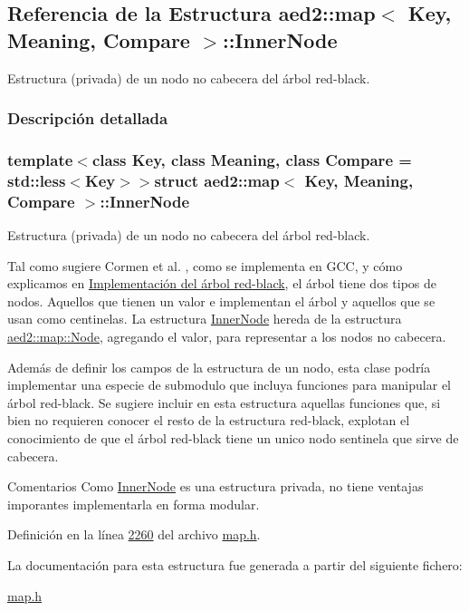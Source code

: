\hypertarget{structaed2_1_1map_1_1InnerNode}{\subsection{\-Referencia de la \-Estructura aed2\-:\-:map$<$ \-Key, \-Meaning, \-Compare $>$\-:\-:\-Inner\-Node}
\label{structaed2_1_1map_1_1InnerNode}
}


\-Estructura (privada) de un nodo no cabecera del árbol red-\/black.  




\subsubsection{\-Descripción detallada}
\subsubsection*{template$<$class \-Key, class \-Meaning, class \-Compare = std\-::less$<$\-Key$>$$>$struct aed2\-::map$<$ Key, Meaning, Compare $>$\-::\-Inner\-Node}

\-Estructura (privada) de un nodo no cabecera del árbol red-\/black. 

\-Tal como sugiere \-Cormen et al. \cite{CormenLeisersonRivestStein2009}, como se implementa en \-G\-C\-C, y cómo explicamos en \hyperlink{Implementacion}{\-Implementación del árbol red-\/black}, el árbol tiene dos tipos de nodos. \-Aquellos que tienen un valor e implementan el árbol y aquellos que se usan como centinelas. \-La estructura \hyperlink{structaed2_1_1map_1_1InnerNode}{\-Inner\-Node} hereda de la estructura \hyperlink{structaed2_1_1map_1_1Node}{aed2\-::map\-::\-Node}, agregando el valor, para representar a los nodos no cabecera.

\-Además de definir los campos de la estructura de un nodo, esta clase podría implementar una especie de submodulo que incluya funciones para manipular el árbol red-\/black. \-Se sugiere incluir en esta estructura aquellas funciones que, si bien no requieren conocer el resto de la estructura red-\/black, explotan el conocimiento de que el árbol red-\/black tiene un unico nodo sentinela que sirve de cabecera.

\begin{DoxyRemark}{\-Comentarios}
\-Como \hyperlink{structaed2_1_1map_1_1InnerNode}{\-Inner\-Node} es una estructura privada, no tiene ventajas imporantes implementarla en forma modular. 
\end{DoxyRemark}


\-Definición en la línea \hyperlink{map_8h_source_l02260}{2260} del archivo \hyperlink{map_8h_source}{map.\-h}.



\-La documentación para esta estructura fue generada a partir del siguiente fichero\-:\begin{DoxyCompactItemize}
\item 
\hyperlink{map_8h}{map.\-h}\end{DoxyCompactItemize}
